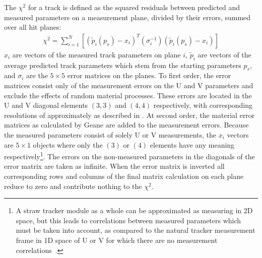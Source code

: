 The $\chi^{2}$ for a track is defined as the squared residuals between predicted and measured parameters on a measurement plane, divided by their errors, summed over all hit planes:
    \begin{align} \label{eq:chi2sum}
        \chi^2 = \sum_{i=1}^{N} [(\widetilde{p}_{i}(p_{s})-x_{i})^{T} (\sigma_{i}^{-1}) (\widetilde{p}_{i}(p_{s})-x_{i})]
    \end{align}
$x_{i}$ are vectors of the measured track parameters on plane $i$, $\widetilde{p}_{i}$ are vectors of the average predicted track parameters which stem from the starting parameters $p_{s}$, and $\sigma_{i}$ are the $5 \times 5$ error matrices on the planes. To first order, the error matrices consist only of the measurement errors on the U and V parameters and exclude the effects of random material processes. These errors are located in the U and V diagonal elements $(3,3)$ and $(4,4)$ respectively, with corresponding resolutions of approximately  as described in . At second order, the material error matrices as calculated by Geane are added to the measurement errors. Because the measured parameters consist of solely U or V measurements, the $x_{i}$ vectors are $5 \times 1$ objects where only the $(3)$ or $(4)$ elements have any meaning respectively\footnote{A straw tracker module as a whole can be approximated as measuring in 2D space, but this leads to correlations between measured parameters which must be taken into account, as compared to the natural tracker measurement frame in 1D space of U or V for which there are no measurement correlations~\cite{UVcorrelations}.}. The errors on the non-measured parameters in the diagonals of the error matrix are taken as infinite. When the error matrix is inverted all corresponding rows and columns of the final matrix calculation on each plane reduce to zero and contribute nothing to the $\chi^{2}$.


